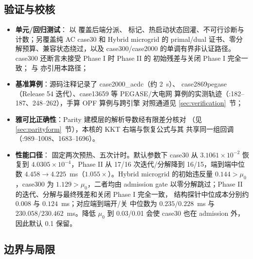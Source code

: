 \subsection{验证与校核}\label{subsec:pipm-verification}

\begin{itemize}
  \item \textbf{单元/回归测试}：
        以  覆盖后端分派、
         标记、热启动状态回灌、不可行诊断与
         计数；另覆盖纯 AC case30 和 Hybrid microgrid 的
        primal/dual 证书、零分解预算、兼容状态绕过，以及 case300/case2000
        的单调有界非认证路径。case300 还断言未接受 Phase I 时 Phase II 的
        初始残差与关闭 Phase I 完全一致；
         与
         亦引用本路径；
  \item \textbf{基准算例}：源码注释记录了 case2000\_acdc（约 2~s）、
        case2869pegase（Release 54 迭代）、case13659 等 PEGASE/大电网
        算例的实测轨迹（:182--187、248--262），手算 OPF 算例与跨引擎
        对照通道见 \ref{sec:verification}~节；
  \item \textbf{雅可比正确性}：Parity 建模层的解析导数经有限差分核对
        （见 \ref{sec:parityform}~节），本核的 KKT 右端与恢复公式与其
        共享同一组回调（:989--1008、1683--1696）。
  \item \textbf{性能口径}：
        固定两次预热、五次计时。默认参数下 case30 从
        $3.1061\times10^{-2}$ 恢复到 $4.0305\times10^{-4}$，Phase II 从
        17/16 次迭代/分解降到 16/15，端到端中位数
        $4.458\to4.225$~ms（$1.055\times$）。Hybrid microgrid 的初始违反量
        $0.144>\mu_0$，case300 为 $1.129>\mu_0$，二者均由 admission gate
        以零分解跳过；Phase II 的迭代、分解与最终残差和关闭 Phase I 完全一致，
        结构探针中位成本分别约 $0.008$ 与 $0.124$~ms；对应端到端开/关
        中位数为 $0.235/0.228$~ms 与 $230.058/230.462$~ms。降低 $\mu_0$ 到
        0.03/0.01 会使 case30 也在 admission 外，因此默认 0.1 保留。
\end{itemize}

\subsection{边界与局限}\label{subsec:pipm-limits}

